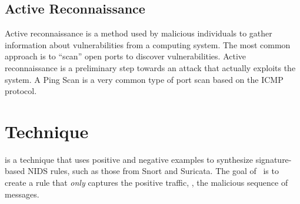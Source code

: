 \documentclass[runningheads]{llncs}
\begin{document}

\subsection{Active Reconnaissance}

Active reconnaissance is a method used by malicious individuals to
gather information about vulnerabilities from a computing system. The
most common approach is to ``scan'' open ports to discover
vulnerabilities. Active reconnaissance is a preliminary step towards
an attack that actually exploits the system. A Ping Scan is a very
common type of port scan based on the ICMP
protocol. 



\subsection{}




\section{Technique}

\tname{} is a technique that uses positive and negative examples to
synthesize signature-based NIDS rules, such as those from Snort and
Suricata. The goal of \tname\ is to create a rule that \emph{only}
captures the positive traffic, \ie{}, the malicious sequence of
messages.
\end{document}
